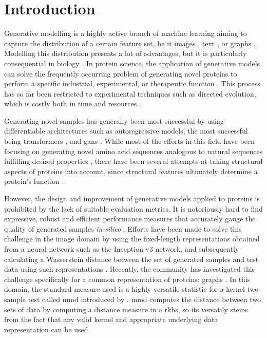 \chapter{Introduction}


Generative modelling is a highly active branch of machine learning aiming to
capture the distribution of a certain feature set, be it images
\citep{saharia2022hierarchical,ramesh2022hierarchical}, text
\citep{brown2020language}, or graphs \citep{guo2020systematic}. Modelling this
distribution presents a lot of advantages, but it is particularly consequential
in biology \citep{lopez2020enhancing,strokach2022deep}. In protein science, the
application of generative models can solve the frequently occurring problem of
generating novel proteins to perform a specific industrial, experimental, or
therapeutic function \citep{jendrusch2021alphadesign, madani2020progen,
  madani2021deep}. This process has so far been restricted to experimental
techniques such as directed evolution, which is costly both in time and
resources \citep{wang2021directed}.

Generating novel samples has generally been most successful by using
differentiable architectures such as autoregressive models, the most successful
being transformers \citep{vaswani2017attention}, and \acrfull{gans}
\citep{goodfellow2014generative}. While most of the efforts in this field have
been focusing on generating novel amino acid sequences analogous to natural
sequences fulfilling desired properties
\citep{riesselman2018deep,biswas2021low,weinstein2021structured,repecka2021expanding,kucera2022conditional},
there have been several attempts at taking structural aspects of proteins into
account, since structural features ultimately determine a protein's function
\citep{anand2018generative, ingraham2019generative, maddhuri2021protein}.

However, the design and improvement of generative models applied to proteins is
prohibited by the lack of suitable evaluation metrics. It is notoriously hard to
find expressive, robust and efficient performance measures that accurately gauge
the quality of generated samples \emph{in-silico} \citep{theis2016note,
betzalel2022study}. Efforts have been made to solve this challenge in the image
domain by using the fixed-length representations obtained from a neural network
such as the Inception v3 network, and subsequently calculating a Wasserstein
distance between the set of generated samples and test data using such
representations \citep{heusel2017gans}. Recently, the community has investigated
this challenge specifically for a common representation of proteins: graphs
\citep{thompson2022evaluation, obray2022evaluation}. In this domain, the
standard measure used is a highly versatile statistic for a kernel two-sample
test called \acrfull{mmd} introduced by \cite{gretton2012kernel}. \acrshort{mmd}
computes the distance between two sets of data by computing a distance measure
in a \acrfull{rkhs}, so its versatily stems from the fact that any valid kernel
and appropriate underlying data representation can be used.

